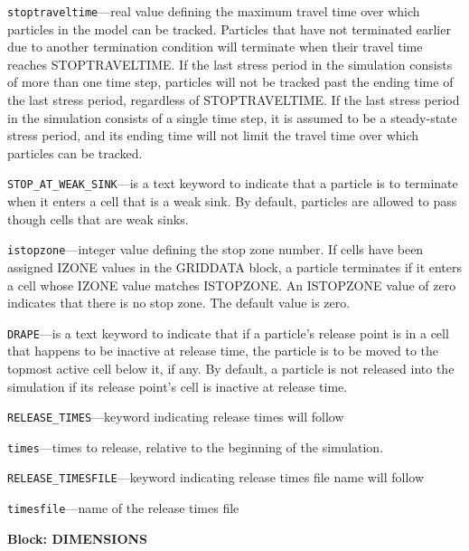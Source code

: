\begin{description}
\item \texttt{stoptraveltime}---real value defining the maximum travel time over which particles in the model can be tracked.  Particles that have not terminated earlier due to another termination condition will terminate when their travel time reaches STOPTRAVELTIME.  If the last stress period in the simulation consists of more than one time step, particles will not be tracked past the ending time of the last stress period, regardless of STOPTRAVELTIME.  If the last stress period in the simulation consists of a single time step, it is assumed to be a steady-state stress period, and its ending time will not limit the travel time over which particles can be tracked.

\item \texttt{STOP\_AT\_WEAK\_SINK}---is a text keyword to indicate that a particle is to terminate when it enters a cell that is a weak sink.  By default, particles are allowed to pass though cells that are weak sinks.

\item \texttt{istopzone}---integer value defining the stop zone number.  If cells have been assigned IZONE values in the GRIDDATA block, a particle terminates if it enters a cell whose IZONE value matches ISTOPZONE.  An ISTOPZONE value of zero indicates that there is no stop zone.  The default value is zero.

\item \texttt{DRAPE}---is a text keyword to indicate that if a particle's release point is in a cell that happens to be inactive at release time, the particle is to be moved to the topmost active cell below it, if any. By default, a particle is not released into the simulation if its release point's cell is inactive at release time.

\item \texttt{RELEASE\_TIMES}---keyword indicating release times will follow

\item \texttt{times}---times to release, relative to the beginning of the simulation.

\item \texttt{RELEASE\_TIMESFILE}---keyword indicating release times file name will follow

\item \texttt{timesfile}---name of the release times file

\end{description}
\item \textbf{Block: DIMENSIONS}

